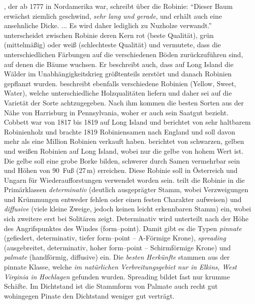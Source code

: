 \documentclass[twocolumn]{scrartcl}
\begin{document}
\citet[S.~67]{wangenheim1781nordamericanischeHolzarten}, der ab 1777
in Nordamerika war, schreibt über die Robinie: \enquote{Dieser Baum
erwächst ziemlich geschwind, \emph{sehr lang und gerade}, und erhält
auch eine ansehnliche Dicke. ... Es wird daher lediglich zu Nuzholze
verwandt.} \citet[S.~249]{Michaux1813arbres} unterscheidet
zwischen Robinie deren Kern rot (beste Qualität), grün (mittelmäßig)
oder weiß (schlechteste Qualität) und vermutete, dass die unterschiedlichen
Färbungen auf die verschiedenen Böden zurückzuführen sind, auf denen die Bäume wuchsen.
Er beschreibt auch, dass auf Long
Island die Wälder im Unabhängigkeitskrieg größtenteils zerstört und
danach Robinien gepflanzt wurden. \cite{cobbett1825woodlands}
beschreibt ebenfalls verschiedene Robinien (Yellow, Sweet, Water),
welche unterschiedliche Holzqualitäten liefern und daher sei auf die
Varietät der Sorte achtzugegeben. Nach ihm kommen die besten
Sorten aus der Nähe von Harrisburg in Pennsylvania, woher er auch
sein Saatgut bezieht. Cobbett war von 1817 bis 1819 auf Long Island
und berichtet von sehr haltbarem Robinienholz und brachte 1819
Robiniensamen nach England und soll davon mehr als eine Million
Robinien verkauft haben. \cite{hicks1883robinie} berichtet von
schwarzen, gelben und weißen Robinien auf Long Island, wobei nur die
gelbe von hohem Wert ist. Die gelbe soll eine grobe Borke bilden,
schwerer durch Samen vermehrbar sein und Höhen von 90~Fuß (27\,m)
erreichen. Diese Robinie soll in Österreich und Ungarn für
Wiederaufforstungen verwendet worden sein. \cite{hopp1941robinie} teilt
die Robinie in die Primärklassen \emph{determinativ} (deutlich ausgeprägter
Stamm, wobei Verzweigungen und Krümmungen entweder fehlen oder
einen festen Charakter aufweisen) und \emph{diffusive} (viele kleine Zweige,
jedoch keinen leicht erkennbaren Stamm) ein, wobei sich zweitere erst
bei Solitären zeigt. Determinativ wird unterteilt nach der Höhe des
Angrifspunktes des Windes (form--point). Damit gibt es die Typen
\emph{pinnate} (gefiedert, determinativ, tiefer form--point --
A-Förmige Krone), \emph{spreading} (ausgebreitet, determinativ, hoher
form--point -- Schirmförmige Krone) und \emph{palmate} (handförmig,
diffusive) ein. Die \emph{besten Herkünfte} stammen aus der pinnate Klasse,
welche \emph{im natürlichen Verbreitungsgebiet nur in Elkins, West Virginia
in Hochlagen} gefunden wurden. Spreading bildet fast nur krumme
Schäfte. Im Dichtstand ist die Stammform von Palmate auch recht gut
wohingegen Pinate den Dichtstand weniger gut verträgt.
\end{document}
